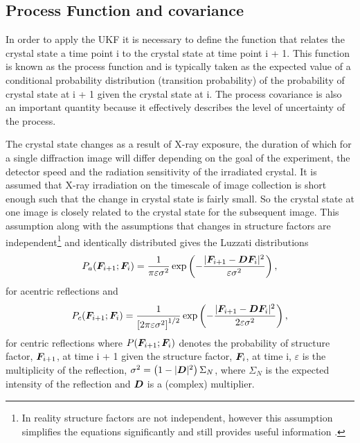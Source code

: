 \subsection{Process Function and covariance}
\label{sub:Process Function and covariance}
In order to apply the UKF it is necessary to define the function that relates the crystal state a time point i to the crystal state at time point i + 1.
This function is known as the process function and is typically taken as the expected value of a conditional probability distribution (transition probability) of the probability of crystal state at i + 1 given the crystal state at i.
The process covariance is also an important quantity because it effectively describes the level of uncertainty of the process.

The crystal state changes as a result of X-ray exposure, the duration of which for a single diffraction image will differ depending on the goal of the experiment, the detector speed and the radiation sensitivity of the irradiated crystal.
It is assumed that X-ray irradiation on the timescale of image collection is short enough such that the change in crystal state is fairly small.
So the crystal state at one image is closely related to the crystal state for the subsequent image.
This assumption along with the assumptions that changes in structure factors are independent\footnote{In reality structure factors are not independent, however this assumption simplifies the equations significantly and still provides useful information \cite{pannu1996improved}.} and identically distributed gives the Luzzati distributions \cite{luzzati1952traitement,read1990structure,pannu1996improved}
\begin{equation}
    P_a(\boldsymbol{F}_{i+1} ; \boldsymbol{F}_i) = \frac{1}{\pi \varepsilon \sigma^2} \exp \left(-\frac{|\boldsymbol{F}_{i+1} - \boldsymbol{D}\boldsymbol{F}_i|^2}{\varepsilon \sigma^2}\right),
    \label{eq:Luzzati distribution for acentric reflections}
\end{equation}
for acentric reflections and
\begin{equation}
    P_c(\boldsymbol{F}_{i+1} ; \boldsymbol{F}_i) = \frac{1}{\left[ 2 \pi \varepsilon \sigma^2 \right]^{1/2}} \exp \left(-\frac{|\boldsymbol{F}_{i+1} - \boldsymbol{D}\boldsymbol{F}_i|^2}{2 \varepsilon \sigma^2}\right),
    \label{eq:Luzzati distribution for centric reflections}
\end{equation}
for centric reflections where $P(\boldsymbol{F}_{i+1} ; \boldsymbol{F}_i)$ denotes the probability of structure factor, $\boldsymbol{F}_{i+1}$, at time i + 1 given the structure factor, $\boldsymbol{F}_{i}$, at time i, $\varepsilon$ is the multiplicity of the reflection, $\sigma^2 = \left(1 - |\boldsymbol{D}|^2 \right)\Sigma_N$, where $\Sigma_N$ is the expected intensity of the reflection and $\boldsymbol{D}$ is a (complex) multiplier.

